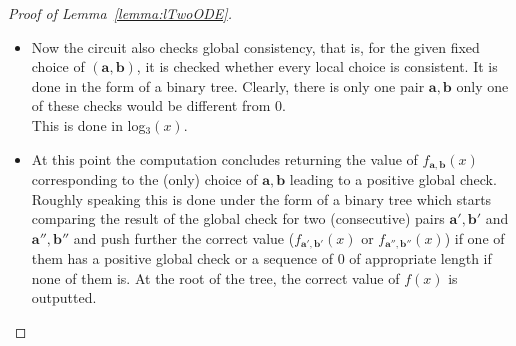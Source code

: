 \documentclass[11pt, oneside]{article}
\newcommand{\longv}[1]{}
\newcommand{\tu}[1]{\mathbf{#1}}
\theoremstyle{definition}
\begin{document}
\begin{toappendix}
\begin{proof}[Proof of Lemma~\ref{lemma:lTwoODE}]
\begin{itemize}
        This is done in constant depth.
        \item Now the circuit also checks global consistency,
        that is, for the given fixed choice of $(\tu a, \tu b)$, it is checked whether every local choice is consistent.
        It is done in the form of a binary tree. Clearly, there is only one pair $\tu a, \tu b$ only one of these checks would be different from 0.
        \\
        This is done in log$_3(x)$.
        \item At this point the computation concludes returning the value of $f_{\tu a, \tu b}(x)$ corresponding to the (only) choice of $\tu a, \tu b$ leading to a positive global check. Roughly speaking this is done under the form of a binary tree which starts  comparing the result of the global check for two (consecutive) pairs $\tu a', \tu b'$ and $\tu a'',\tu b''$ and push further the correct value ($f_{\tu a', \tu b'}(x)$ or $f_{\tu a'', \tu b''}(x)$) if one of them has a positive global check or  a sequence of $0$ of appropriate length if none of them is. At the root of the tree, the correct value of $f(x)$ is outputted. 
\end{itemize}
\longv{   

        \textcolor{red}{The rest of the proof is not useful in a short version}
        
}
\end{proof}
\end{toappendix}
\end{document}
